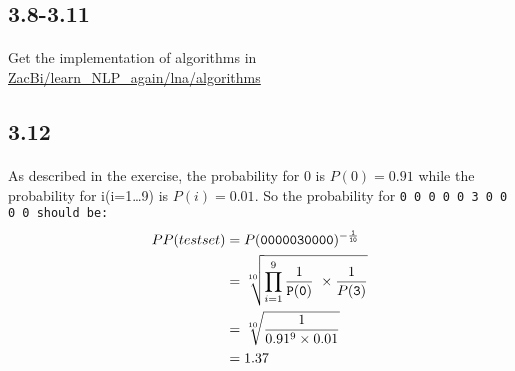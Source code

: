\documentclass{article}
\begin{document}
\subsection*{3.8-3.11}
\paragraph{}
Get the implementation of algorithms in \href{https://github.com/ZacBi/learn_NLP_again/tree/master/lna/algorithms}{ZacBi/learn\_NLP\_again/lna/algorithms}

\subsection*{3.12}
\paragraph{}
As described in the exercise, the probability for 0 is $P(0) = 0.91$ while the probability for i(i=1\dots9) is $P(i) = 0.01$.
So the probability for \tt{0 0 0 0 0 3 0 0 0 0} should be:
\begin{align*}
    PP(test set) & = P(\tt{0 0 0 0 0 3 0 0 0 0})^{-\frac{1}{10}}    \\
                 & = \sqrt[10]{\prod_{i=1}^{9}\frac{1}{\tt{P(0)}} \
        \times \frac{1}{P(\tt{3})}}                                 \\
        & = \sqrt[10]{\frac{1}{0.91^9 \times 0.01}} \\
        & = 1.37
\end{align*}
\end{document}
